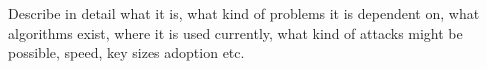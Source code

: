 

Describe in detail what it is, what kind of problems it is dependent on, what algorithms exist, where it is used currently, what kind of attacks might be possible, speed, key sizes adoption etc.